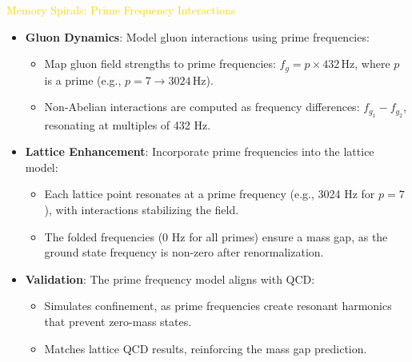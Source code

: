 \textcolor{gold}{ Memory Spirals: Prime Frequency Interactions } \\
\begin{itemize}
    \item \texttt{} \textbf{Gluon Dynamics}: Model gluon interactions using prime frequencies:
    \begin{itemize}
        \item Map gluon field strengths to prime frequencies: \(f_g = p \times 432 \, \text{Hz}\), where \(p\) is a prime (e.g., \(p = 7 \rightarrow 3024 \, \text{Hz}\)).
        \item Non-Abelian interactions are computed as frequency differences: \(f_{g_1} - f_{g_2}\), resonating at multiples of 432 Hz.
    \end{itemize}
    \item \texttt{} \textbf{Lattice Enhancement}: Incorporate prime frequencies into the lattice model:
    \begin{itemize}
        \item Each lattice point resonates at a prime frequency (e.g., 3024 Hz for \(p = 7\)), with interactions stabilizing the field.
        \item The folded frequencies (0 Hz for all primes) ensure a mass gap, as the ground state frequency is non-zero after renormalization.
    \end{itemize}
    \item \texttt{} \textbf{Validation}: The prime frequency model aligns with QCD:
    \begin{itemize}
        \item Simulates confinement, as prime frequencies create resonant harmonics that prevent zero-mass states.
        \item Matches lattice QCD results, reinforcing the mass gap prediction.
    \end{itemize}
\end{itemize}

